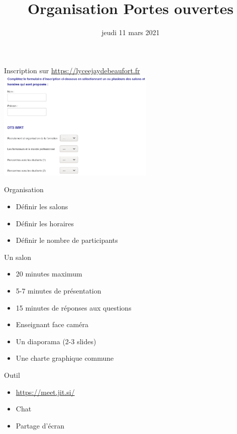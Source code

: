 \documentclass[bigger]{beamer}
\title{Organisation Portes ouvertes}
\institute{Lycée Jay de Beaufort}
\date{jeudi 11 mars 2021}
\begin{document}
\frame{\titlepage}
\begin{frame}
\begin{center}
\Large{Inscription sur \url{https://lyceejaydebeaufort.fr}}
\centering
\includegraphics[width=7.5cm]{ressources/inscription.png}
\label{IMG}
\end{center}
\end{frame}

\begin{frame}
\begin{center}
    \begin{minipage}{0.6\textwidth}
    \Large Organisation \normalsize
      \begin{itemize}
      \item Définir les salons
      \item Définir les horaires
      \item Définir le nombre de participants
      \end{itemize}
    \end{minipage}
  \end{center}
\end{frame}
\begin{frame}
\begin{center}
\begin{minipage}{0.7\textwidth}
\Large Un salon \normalsize
      \begin{itemize}
      \item 20 minutes maximum
      \item 5-7 minutes de présentation
      \item 15 minutes de réponses aux questions
      \item Enseignant face caméra
      \item Un diaporama (2-3 slides)
      \item Une charte graphique commune
      \end{itemize}
    \end{minipage}
\end{center}
\end{frame}
\begin{frame}
\begin{center}
\begin{minipage}{0.5\textwidth}
\Large Outil \normalsize
      \begin{itemize}
      \item \url{https://meet.jit.si/}
      \item Chat
      \item Partage d'écran
      \end{itemize}
    \end{minipage}
\end{center}
\end{frame}
\end{document}
